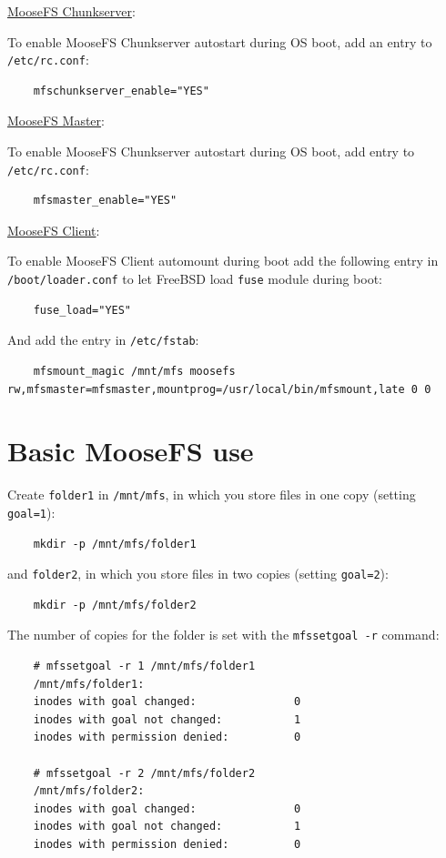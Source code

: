 \documentclass[a4paper,11pt,english]{report}
\def\code#1{\texttt{#1}}
\begin{document}
		\underline{MooseFS Chunkserver}:
		
		To enable MooseFS Chunkserver autostart during OS boot, add an entry to \code{/etc/rc.conf}:
		\begin{lstlisting}
	mfschunkserver_enable="YES"
		\end{lstlisting}
		
		\underline{MooseFS Master}:
		
		To enable MooseFS Chunkserver autostart during OS boot, add entry to \code{/etc/rc.conf}:
		\begin{lstlisting}
	mfsmaster_enable="YES"
		\end{lstlisting}

		\underline{MooseFS Client}:
		
		To enable MooseFS Client automount during boot add the following entry in \code{/boot/loader.conf} to let FreeBSD load \code{fuse} module during boot:
		\begin{lstlisting}
	fuse_load="YES"
		\end{lstlisting}
		
		And add the entry in \code{/etc/fstab}:
		\begin{lstlisting}
	mfsmount_magic /mnt/mfs moosefs rw,mfsmaster=mfsmaster,mountprog=/usr/local/bin/mfsmount,late 0 0 
		\end{lstlisting}

		
		\newpage
	
		\section{Basic MooseFS use}
		Create \code{folder1} in \code{/mnt/mfs}, in which you store files in one copy (setting \code{goal=1}):
		\begin{lstlisting}
	mkdir -p /mnt/mfs/folder1
		\end{lstlisting}

and \code{folder2}, in which you store files in two copies (setting \code{goal=2}):
		\begin{lstlisting}
	mkdir -p /mnt/mfs/folder2
		\end{lstlisting}


		The number of copies for the folder is set with the \code{mfssetgoal -r} command:
		\begin{lstlisting}
	# mfssetgoal -r 1 /mnt/mfs/folder1
	/mnt/mfs/folder1:
	inodes with goal changed:				0
	inodes with goal not changed:			1
	inodes with permission denied:			0

	# mfssetgoal -r 2 /mnt/mfs/folder2
	/mnt/mfs/folder2:
	inodes with goal changed:				0
	inodes with goal not changed:			1
	inodes with permission denied:			0
		\end{lstlisting}
\end{document}
